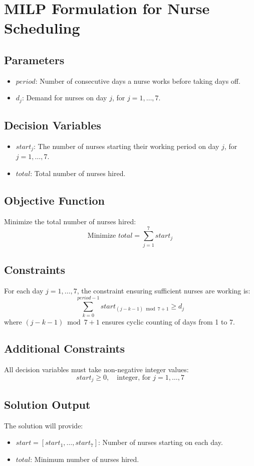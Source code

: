 \documentclass{article}
\begin{document}
\section*{MILP Formulation for Nurse Scheduling}

\subsection*{Parameters}
\begin{itemize}
    \item $period$: Number of consecutive days a nurse works before taking days off.
    \item $d_j$: Demand for nurses on day $j$, for $j = 1, \ldots, 7$.
\end{itemize}

\subsection*{Decision Variables}
\begin{itemize}
    \item $start_j$: The number of nurses starting their working period on day $j$, for $j = 1, \ldots, 7$.
    \item $total$: Total number of nurses hired.
\end{itemize}

\subsection*{Objective Function}
Minimize the total number of nurses hired:
\[
\text{Minimize } total = \sum_{j=1}^{7} start_j
\]

\subsection*{Constraints}
For each day $j = 1, \ldots, 7$, the constraint ensuring sufficient nurses are working is:
\[
\sum_{k=0}^{period-1} start_{(j-k-1) \bmod 7 + 1} \geq d_j
\]
where $(j-k-1) \bmod 7 + 1$ ensures cyclic counting of days from 1 to 7.

\subsection*{Additional Constraints}
All decision variables must take non-negative integer values:
\[
start_j \geq 0, \quad \text{integer, for } j = 1, \ldots, 7
\]

\subsection*{Solution Output}
The solution will provide:
\begin{itemize}
    \item $start = [start_1, \ldots, start_7]$: Number of nurses starting on each day.
    \item $total$: Minimum number of nurses hired.
\end{itemize}
\end{document}
